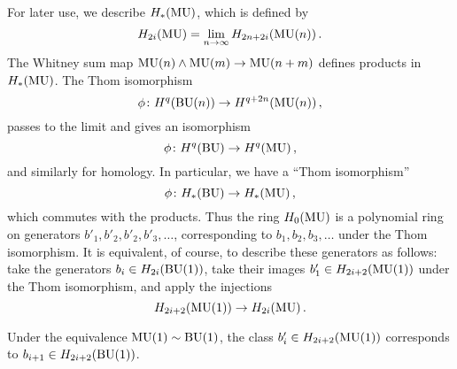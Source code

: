\documentclass[../main]{subfiles}
\begin{document}
For later use, we describe $H_{\ast}(\operatorname{MU})$, which is defined by 
\begin{equation*}
	H_{2i}(\operatorname{MU}) = \lim_{n \to \infty} H_{2n+2i}(\mathrm{MU}(n))\,.
\end{equation*} 
The Whitney sum map $\mathrm{MU}(n) \wedge \mathrm{MU}(m) \to \mathrm{MU}(n+m)$ defines products in $H_{\ast}(\operatorname{MU})$. 
The Thom isomorphism 
\begin{equation*}
	\phi\colon  H^q(\mathrm{BU}(n)) \to  H^{q+2n}(\mathrm{MU}(n))\,,
\end{equation*}
passes to the limit and gives an isomorphism
\begin{equation*}
	\phi\colon  H^q(\operatorname{BU}) \to  H^q(\operatorname{MU})\,,
\end{equation*}
and similarly for homology. 
In particular, we have a ``Thom isomorphism''
\begin{equation*}
	\phi\colon  H_{\ast}(\operatorname{BU} )  \to  H_{\ast}(\operatorname{MU} )\,, 
\end{equation*} 
which commutes with the products. 
Thus the ring $H_{0}(\operatorname{MU}) $ is a polynomial ring on generators $b'_1, b'_2,b'_2,b'_3,\ldots$, corresponding to $b_1, b_2, b_3, \ldots$ under the Thom isomorphism. 
It is equivalent, of course, to describe these generators as follows: 
take the generators $b_{i} \in H_{2i}(\mathrm{BU}(1)) $, take their images $b'_{1} \in H_{2i+2}(\mathrm{MU}(1))$ under the Thom isomorphism, and apply the injections
\begin{equation*}
	H_{2i+2}(\mathrm{MU}(1)) \to H_{2i}(\operatorname{MU} )\,.
\end{equation*}

Under the equivalence $\mathrm{MU}(1) \sim \mathrm{BU}(1)$, the class $b'_{i} \in H_{2i+2}(\mathrm{MU}(1))$ corresponds to $b_{i+1} \in H_{2i+2}(\mathrm{BU}(1))$.
\end{document}
